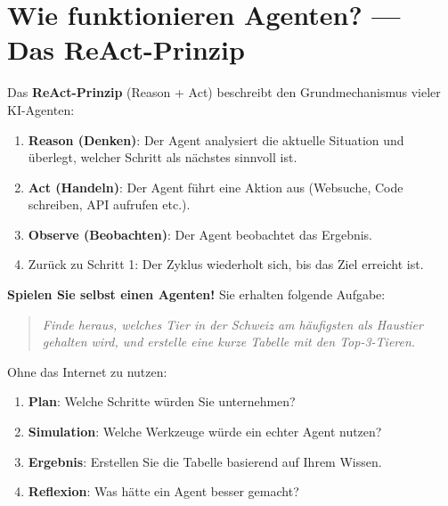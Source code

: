 \section{Wie funktionieren Agenten? --- Das ReAct-Prinzip}

\begin{mydefinition}
      Das \textbf{ReAct-Prinzip} (Reason + Act) beschreibt den Grundmechanismus
      vieler KI-Agenten:

      \begin{enumerate}
            \item \textbf{Reason (Denken)}: Der Agent analysiert die aktuelle Situation
                  und überlegt, welcher Schritt als nächstes sinnvoll ist.
            \item \textbf{Act (Handeln)}: Der Agent führt eine Aktion aus (Websuche,
                  Code schreiben, API aufrufen etc.).
            \item \textbf{Observe (Beobachten)}: Der Agent beobachtet das Ergebnis.
            \item Zurück zu Schritt 1: Der Zyklus wiederholt sich, bis das Ziel erreicht ist.
      \end{enumerate}
\end{mydefinition}

\begin{myexercise}
      \textbf{Spielen Sie selbst einen Agenten!} Sie erhalten folgende Aufgabe:

      \begin{quote}
            \textit{Finde heraus, welches Tier in der Schweiz am häufigsten als
                  Haustier gehalten wird, und erstelle eine kurze Tabelle mit den Top-3-Tieren.}
      \end{quote}

      Ohne das Internet zu nutzen:
      \begin{enumerate}
            \item \textbf{Plan}: Welche Schritte würden Sie unternehmen?
            \item \textbf{Simulation}: Welche Werkzeuge würde ein echter Agent nutzen?
            \item \textbf{Ergebnis}: Erstellen Sie die Tabelle basierend auf Ihrem Wissen.
            \item \textbf{Reflexion}: Was hätte ein Agent besser gemacht?
      \end{enumerate}
\end{myexercise}

